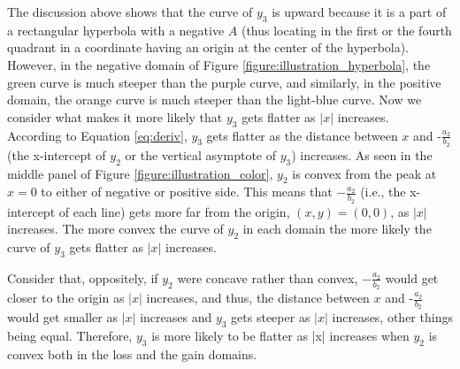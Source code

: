 \documentclass[11pt, a4paper]{article}
\begin{document}

\noindent
The discussion above shows that the curve of $y_3$ is upward because it is a part of a rectangular hyperbola with a negative $A$ (thus locating in the first or the fourth quadrant in a coordinate having an origin at the center of the hyperbola). However, in the negative domain of Figure \ref{figure:illustration_hyperbola}, the green curve is much steeper than the purple curve, and similarly, in the positive domain, the orange curve is much steeper than the light-blue curve. Now we consider what makes it more likely that $y_3$ gets flatter as $|x|$ increases.\\

\noindent
According to Equation \ref{eq:deriv}, $y_3$ gets flatter as the distance between $x$ and $\mbox{-}\frac{a_2}{b_2}$ (the x-intercept of $y_2$ or the vertical asymptote of $y_3$) increases. As seen in the middle panel of Figure \ref{figure:illustration_color}, $y_2$ is convex from the peak at $x=0$ to either of negative or positive side. This means that $-\frac{a_2}{b_2}$ (i.e., the x-intercept of each line) gets more far from the origin, $(x, y)=(0, 0)$, as $|x|$ increases. 
The more convex the curve of $y_2$ in each domain the more likely the curve of $y_3$ gets flatter as $|x|$ increases.  


Consider that, oppositely, if $y_2$ were concave rather than convex, $-\frac{a_2}{b_2}$ would get closer to the origin as $|x|$ increases, and thus, the distance between $x$ and $\mbox{-}\frac{a_2}{b_2}$ would get smaller as $|x|$ increases and $y_3$ gets steeper as $|x|$ increases, other things being equal. Therefore, $y_3$ is more likely to be flatter as |x| increases when $y_2$ is convex both in the loss and the gain domains.\\
\end{document}
